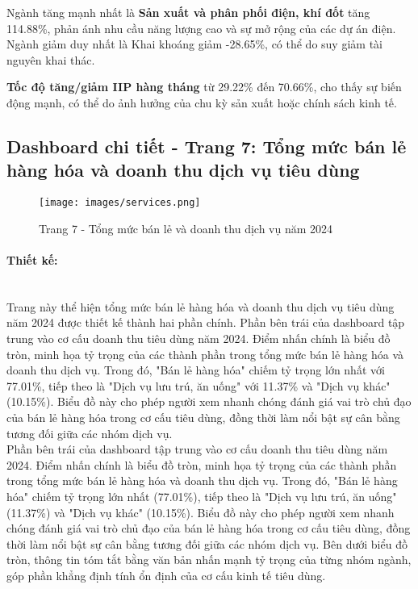 \documentclass[a4paper]{report}
\begin{document}
{{Ngành tăng mạnh nhất là \textbf{Sản xuất và phân phối điện, khí đốt} tăng 114.88\%, phản ánh nhu cầu năng lượng cao và sự mở rộng của các dự án điện. Ngành giảm duy nhất là Khai khoáng giảm -28.65\%, có thể do suy giảm tài nguyên khai thác.

\textbf{Tốc độ tăng/giảm IIP hàng tháng} từ 29.22\% đến 70.66\%, cho thấy sự biến động mạnh, có thể do ảnh hưởng của chu kỳ sản xuất hoặc chính sách kinh tế.
\newpage
\subsection{Dashboard chi tiết - Trang 7: Tổng mức bán lẻ hàng hóa và doanh thu dịch vụ tiêu dùng}

\begin{figure}[H]
    \centering
    \texttt{[image: images/services.png]}
    \caption{Trang 7 - Tổng mức bán lẻ và doanh thu dịch vụ năm 2024}
    \label{fig:enter-label}
\end{figure}

\paragraph{Thiết kế: } \mbox{}\\

Trang này thể hiện  tổng mức bán lẻ hàng hóa và doanh thu dịch vụ tiêu dùng năm 2024 được thiết kế thành hai phần chính. Phần bên trái của dashboard tập trung vào cơ cấu doanh thu tiêu dùng năm 2024. Điểm nhấn chính là biểu đồ tròn, minh họa tỷ trọng của các thành phần trong tổng mức bán lẻ hàng hóa và doanh thu dịch vụ. Trong đó, "Bán lẻ hàng hóa" chiếm tỷ trọng lớn nhất với 77.01\%, tiếp theo là "Dịch vụ lưu trú, ăn uống" với 11.37\% và "Dịch vụ khác" (10.15\%). Biểu đồ này cho phép người xem nhanh chóng đánh giá vai trò chủ đạo của bán lẻ hàng hóa trong cơ cấu tiêu dùng, đồng thời làm nổi bật sự cân bằng tương đối giữa các nhóm dịch vụ. \\

Phần bên trái của dashboard tập trung vào cơ cấu doanh thu tiêu dùng năm 2024. Điểm nhấn chính là biểu đồ tròn, minh họa tỷ trọng của các thành phần trong tổng mức bán lẻ hàng hóa và doanh thu dịch vụ. Trong đó, "Bán lẻ hàng hóa" chiếm tỷ trọng lớn nhất (77.01\%), tiếp theo là "Dịch vụ lưu trú, ăn uống" (11.37\%) và "Dịch vụ khác" (10.15\%). Biểu đồ này cho phép người xem nhanh chóng đánh giá vai trò chủ đạo của bán lẻ hàng hóa trong cơ cấu tiêu dùng, đồng thời làm nổi bật sự cân bằng tương đối giữa các nhóm dịch vụ. Bên dưới biểu đồ tròn, thông tin tóm tắt bằng văn bản nhấn mạnh tỷ trọng của từng nhóm ngành, góp phần khẳng định tính ổn định của cơ cấu kinh tế tiêu dùng.

}}
\end{document}

